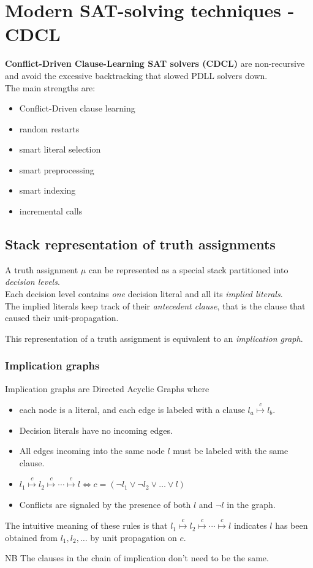 \documentclass{article}
\begin{document}
\section{Modern SAT-solving techniques - CDCL}
\textbf{Conflict-Driven Clause-Learning SAT solvers (CDCL)} are non-recursive and avoid the excessive backtracking that slowed PDLL solvers down.\\
The main strengths are:
\begin{itemize}
    \item Conflict-Driven clause learning
    \item random restarts
    \item smart literal selection
    \item smart preprocessing
    \item smart indexing
    \item incremental calls
\end{itemize}

\subsection{Stack representation of truth assignments}
A truth assignment $\mu$ can be represented as a special stack partitioned into \textit{decision levels}.\\
Each decision level contains \textit{one} decision literal and all its \textit{implied literals}.\\
The implied literals keep track of their \textit{antecedent clause}, that is the clause that caused their unit-propagation.

This representation of a truth assignment is equivalent to an \textit{implication graph}.

\subsubsection{Implication graphs}
Implication graphs are Directed Acyclic Graphs where
\begin{itemize}
    \item    each node is a literal, and each edge is labeled with a clause $l_a\overset{c}\mapsto l_b$. 
    \item Decision literals have no incoming edges.
    \item All edges incoming into the same node $l$ must be labeled with the same clause.
    \item $l_1\overset{c}\mapsto l_2 \overset{c}\mapsto \cdots \overset{c}\mapsto l \iff c=(\neg l_1\vee\neg l_2\vee\dots\vee l)$
    \item Conflicts are signaled by the presence of both $l$ and $\neg l$ in the graph.
\end{itemize} 
The intuitive meaning of these rules is that $l_1\overset{c}\mapsto l_2 \overset{c}\mapsto \cdots \overset{c}\mapsto l$ indicates $l$ has been obtained from $l_1,l_2,\dots$ by unit propagation on $c$.
\begin{callout}[purple]{NB}
    The clauses in the chain of implication don't need to be the same.
\end{callout}
\end{document}
